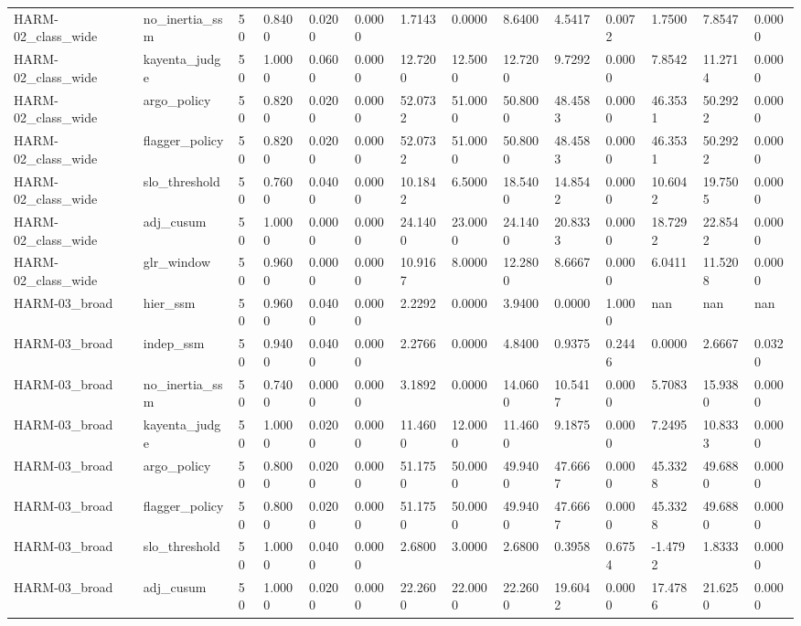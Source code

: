 \begin{table}[htbp]
\begin{tabular}{llllllllllllll}
HARM-02\_class\_wide & no\_inertia\_ssm & 50 & 0.8400 & 0.0200 & 0.0000 & 1.7143 & 0.0000 & 8.6400 & 4.5417 & 0.0072 & 1.7500 & 7.8547 & 0.0000 \\
HARM-02\_class\_wide & kayenta\_judge & 50 & 1.0000 & 0.0600 & 0.0000 & 12.7200 & 12.5000 & 12.7200 & 9.7292 & 0.0000 & 7.8542 & 11.2714 & 0.0000 \\
HARM-02\_class\_wide & argo\_policy & 50 & 0.8200 & 0.0200 & 0.0000 & 52.0732 & 51.0000 & 50.8000 & 48.4583 & 0.0000 & 46.3531 & 50.2922 & 0.0000 \\
HARM-02\_class\_wide & flagger\_policy & 50 & 0.8200 & 0.0200 & 0.0000 & 52.0732 & 51.0000 & 50.8000 & 48.4583 & 0.0000 & 46.3531 & 50.2922 & 0.0000 \\
HARM-02\_class\_wide & slo\_threshold & 50 & 0.7600 & 0.0400 & 0.0000 & 10.1842 & 6.5000 & 18.5400 & 14.8542 & 0.0000 & 10.6042 & 19.7505 & 0.0000 \\
HARM-02\_class\_wide & adj\_cusum & 50 & 1.0000 & 0.0000 & 0.0000 & 24.1400 & 23.0000 & 24.1400 & 20.8333 & 0.0000 & 18.7292 & 22.8542 & 0.0000 \\
HARM-02\_class\_wide & glr\_window & 50 & 0.9600 & 0.0000 & 0.0000 & 10.9167 & 8.0000 & 12.2800 & 8.6667 & 0.0000 & 6.0411 & 11.5208 & 0.0000 \\
HARM-03\_broad & hier\_ssm & 50 & 0.9600 & 0.0400 & 0.0000 & 2.2292 & 0.0000 & 3.9400 & 0.0000 & 1.0000 & nan & nan & nan \\
HARM-03\_broad & indep\_ssm & 50 & 0.9400 & 0.0400 & 0.0000 & 2.2766 & 0.0000 & 4.8400 & 0.9375 & 0.2446 & 0.0000 & 2.6667 & 0.0320 \\
HARM-03\_broad & no\_inertia\_ssm & 50 & 0.7400 & 0.0000 & 0.0000 & 3.1892 & 0.0000 & 14.0600 & 10.5417 & 0.0000 & 5.7083 & 15.9380 & 0.0000 \\
HARM-03\_broad & kayenta\_judge & 50 & 1.0000 & 0.0200 & 0.0000 & 11.4600 & 12.0000 & 11.4600 & 9.1875 & 0.0000 & 7.2495 & 10.8333 & 0.0000 \\
HARM-03\_broad & argo\_policy & 50 & 0.8000 & 0.0200 & 0.0000 & 51.1750 & 50.0000 & 49.9400 & 47.6667 & 0.0000 & 45.3328 & 49.6880 & 0.0000 \\
HARM-03\_broad & flagger\_policy & 50 & 0.8000 & 0.0200 & 0.0000 & 51.1750 & 50.0000 & 49.9400 & 47.6667 & 0.0000 & 45.3328 & 49.6880 & 0.0000 \\
HARM-03\_broad & slo\_threshold & 50 & 1.0000 & 0.0400 & 0.0000 & 2.6800 & 3.0000 & 2.6800 & 0.3958 & 0.6754 & -1.4792 & 1.8333 & 0.0000 \\
HARM-03\_broad & adj\_cusum & 50 & 1.0000 & 0.0200 & 0.0000 & 22.2600 & 22.0000 & 22.2600 & 19.6042 & 0.0000 & 17.4786 & 21.6250 & 0.0000 \\

\end{tabular}
\end{table}
